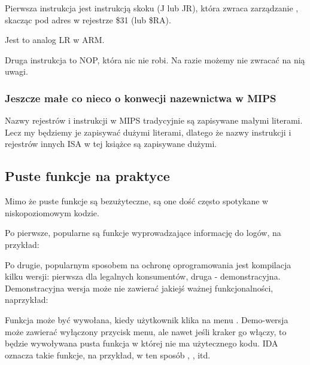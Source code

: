 
Pierwsza instrukcja jest instrukcją skoku (J lub JR),
która zwraca zarządzanie , skacząc pod adres w rejestrze \$31 (lub \$RA).

Jest to analog \ac{LR} w ARM.

Druga instrukcja to \ac{NOP}, która nic nie robi.
Na razie możemy nie zwracać na nią uwagi.

\subsubsection{Jeszcze małe co nieco o konwecji nazewnictwa w MIPS}
Nazwy rejestrów i instrukcji w MIPS tradycyjnie są zapisywane małymi literami.
Lecz my będziemy je zapisywać dużymi literami, dlatego że nazwy instrukcji i rejestrów innych 
\ac{ISA} w tej książce są zapisywane dużymi.

\subsection{Puste funkcje na praktyce}

Mimo że puste funkcje są bezużyteczne, są one dość często spotykane w niskopoziomowym kodzie.

Po pierwsze, popularne są funkcje wyprowadzające informację do logów, na przykład:



Po drugie, popularnym sposobem na ochronę oprogramowania jest kompilacja kilku wersji: pierwsza dla legalnych konsumentów, druga - demonstracyjna. Demonstracyjna wersja może nie zawierać jakiejś ważnej funkcjonalności, naprzykład:


Funkcja  może być wywołana, kiedy użytkownik klika na menu .
Demo-wersja może zawierać wyłączony przycisk menu, ale nawet jeśli kraker go włączy, to będzie wywoływana pusta funkcja w której nie ma użytecznego kodu.
IDA oznacza takie funkcje, na przykład, w ten sposób , , itd.


